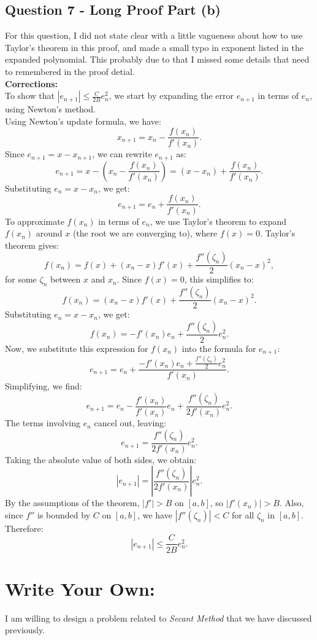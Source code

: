 \documentclass[12pt]{article}
\begin{document}
\subsection*{Question 7 - Long Proof Part (b)}
For this question, I did not state clear with a little vagueness about how to use Taylor's theorem in this proof, and made a small typo in exponent listed in the expanded polynomial. 
This probably due to that I missed some details that need to remembered in the proof detial.
\\
\textbf{Corrections: }
\\
To show that \( |e_{n+1}| \leq \frac{C}{2B} e_n^2 \), we start by expanding the error \( e_{n+1} \) in terms of \( e_n \), using Newton’s method.
\\
Using Newton's update formula, we have:
\[
   x_{n+1} = x_n - \frac{f(x_n)}{f'(x_n)}.
\]
Since \( e_{n+1} = x - x_{n+1} \), we can rewrite \( e_{n+1} \) as:
\[
   e_{n+1} = x - \left( x_n - \frac{f(x_n)}{f'(x_n)} \right) = (x - x_n) + \frac{f(x_n)}{f'(x_n)}.
\]
Substituting \( e_n = x - x_n \), we get:
\[
   e_{n+1} = e_n + \frac{f(x_n)}{f'(x_n)}.
\]
To approximate \( f(x_n) \) in terms of \( e_n \), we use Taylor’s theorem to expand \( f(x_n) \) around \( x \) (the root we are converging to), where \( f(x) = 0 \). Taylor’s theorem gives:
\[
   f(x_n) = f(x) + (x_n - x) f'(x) + \frac{f''(\zeta_n)}{2} (x_n - x)^2,
\]
for some \( \zeta_n \) between \( x \) and \( x_n \). Since \( f(x) = 0 \), this simplifies to:
\[
   f(x_n) = (x_n - x) f'(x) + \frac{f''(\zeta_n)}{2} (x_n - x)^2.
\]
Substituting \( e_n = x - x_n \), we get:
\[
   f(x_n) = -f'(x_n) e_n + \frac{f''(\zeta_n)}{2} e_n^2.
\]
Now, we substitute this expression for \( f(x_n) \) into the formula for \( e_{n+1} \):
\[
   e_{n+1} = e_n + \frac{-f'(x_n) e_n + \frac{f''(\zeta_n)}{2} e_n^2}{f'(x_n)}.
\]
Simplifying, we find:
\[
   e_{n+1} = e_n - \frac{f'(x_n)}{f'(x_n)} e_n + \frac{f''(\zeta_n)}{2 f'(x_n)} e_n^2.
\]
The terms involving \( e_n \) cancel out, leaving:
\[
   e_{n+1} = \frac{f''(\zeta_n)}{2 f'(x_n)} e_n^2.
\]
Taking the absolute value of both sides, we obtain:
\[
   |e_{n+1}| = \left| \frac{f''(\zeta_n)}{2 f'(x_n)} \right| e_n^2.
\]
By the assumptions of the theorem, \( |f'| > B \) on \( [a, b] \), so \( |f'(x_n)| > B \). Also, since \( f'' \) is bounded by \( C \) on \( [a, b] \), we have \( |f''(\zeta_n)| < C \) for all \( \zeta_n \) in \( [a, b] \). Therefore:
\[
   |e_{n+1}| \leq \frac{C}{2B} e_n^2.
\]

\section*{Write Your Own: }
I am willing to design a problem related to \textit{Secant Method} that we have discussed previously.
\end{document}
